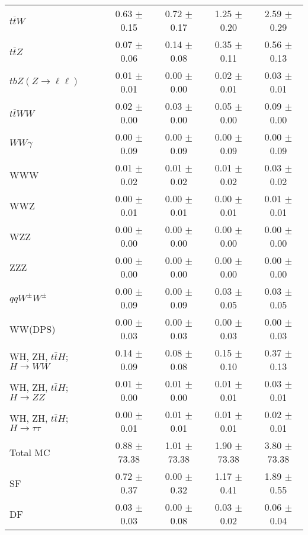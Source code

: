 \begin{tabular}{l|cccc}
                   $t\overline{t}W$ &  0.63 $\pm$  0.15 &  0.72 $\pm$  0.17 &  1.25 $\pm$  0.20 &  2.59 $\pm$  0.29 \\
                   $t\overline{t}Z$ &  0.07 $\pm$  0.06 &  0.14 $\pm$  0.08 &  0.35 $\pm$  0.11 &  0.56 $\pm$  0.13 \\
    $tbZ (Z \rightarrow \ell \ell)$ &  0.01 $\pm$  0.01 &  0.00 $\pm$  0.00 &  0.02 $\pm$  0.01 &  0.03 $\pm$  0.01 \\
                  $t\overline{t}WW$ &  0.02 $\pm$  0.00 &  0.03 $\pm$  0.00 &  0.05 $\pm$  0.00 &  0.09 $\pm$  0.00 \\
                         $WW\gamma$ &  0.00 $\pm$  0.09 &  0.00 $\pm$  0.09 &  0.00 $\pm$  0.09 &  0.00 $\pm$  0.09 \\
                                WWW &  0.01 $\pm$  0.02 &  0.01 $\pm$  0.02 &  0.01 $\pm$  0.02 &  0.03 $\pm$  0.02 \\
                                WWZ &  0.00 $\pm$  0.01 &  0.00 $\pm$  0.01 &  0.00 $\pm$  0.01 &  0.01 $\pm$  0.01 \\
                                WZZ &  0.00 $\pm$  0.00 &  0.00 $\pm$  0.00 &  0.00 $\pm$  0.00 &  0.00 $\pm$  0.00 \\
                                ZZZ &  0.00 $\pm$  0.00 &  0.00 $\pm$  0.00 &  0.00 $\pm$  0.00 &  0.00 $\pm$  0.00 \\
                 $qqW^{\pm}W^{\pm}$ &  0.00 $\pm$  0.09 &  0.00 $\pm$  0.09 &  0.03 $\pm$  0.05 &  0.03 $\pm$  0.05 \\
                            WW(DPS) &  0.00 $\pm$  0.03 &  0.00 $\pm$  0.03 &  0.00 $\pm$  0.03 &  0.00 $\pm$  0.03 \\
WH, ZH, $t\bar{t}H$; $H \rightarrow WW$ &  0.14 $\pm$  0.09 &  0.08 $\pm$  0.08 &  0.15 $\pm$  0.10 &  0.37 $\pm$  0.13 \\
WH, ZH, $t\bar{t}H$; $H \rightarrow ZZ$ &  0.01 $\pm$  0.00 &  0.01 $\pm$  0.00 &  0.01 $\pm$  0.01 &  0.03 $\pm$  0.01 \\
WH, ZH, $t\bar{t}H$; $H \rightarrow \tau\tau$ &  0.00 $\pm$  0.01 &  0.01 $\pm$  0.01 &  0.01 $\pm$  0.01 &  0.02 $\pm$  0.01 \\
\hline\hline
                           Total MC &  0.88 $\pm$ 73.38 &  1.01 $\pm$ 73.38 &  1.90 $\pm$ 73.38 &  3.80 $\pm$ 73.38 \\
\hline
                                 SF &  0.72 $\pm$  0.37 &  0.00 $\pm$  0.32 &  1.17 $\pm$  0.41 &  1.89 $\pm$  0.55 \\
                                 DF &  0.03 $\pm$  0.03 &  0.00 $\pm$  0.08 &  0.03 $\pm$  0.02 &  0.06 $\pm$  0.04 \\

\end{tabular}
